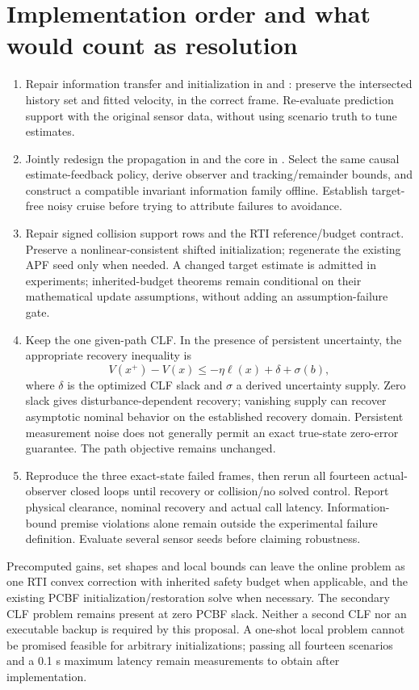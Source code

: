 \documentclass[11pt]{article}
\begin{document}
\section{Implementation order and what would count as resolution}
\begin{enumerate}[leftmargin=*]
\item Repair information transfer and initialization in
 and
: preserve the intersected history
set and fitted velocity, in the correct frame. Re-evaluate prediction support
with the original sensor data, without using scenario truth to tune estimates.
\item Jointly redesign the propagation in 
and the core in . Select the same causal
estimate-feedback policy, derive observer and tracking/remainder bounds, and
construct a compatible invariant information family offline. Establish
target-free noisy cruise before trying to attribute failures to avoidance.
\item Repair signed collision support rows and the RTI reference/budget
contract. Preserve a nonlinear-consistent shifted initialization; regenerate
the existing APF seed only when needed. A changed target estimate is admitted
in experiments; inherited-budget theorems remain conditional on their
mathematical update assumptions, without adding an assumption-failure gate.
\item Keep the one given-path CLF. In the presence of persistent uncertainty,
the appropriate recovery inequality is
\[
 V(x^+)-V(x)\le-\eta\ell(x)+\delta+\sigma(b),
\]
where $\delta$ is the optimized CLF slack and $\sigma$ a derived uncertainty
supply. Zero slack gives disturbance-dependent recovery; vanishing supply
can recover asymptotic nominal behavior on the established recovery domain.
Persistent measurement noise does not generally permit an exact true-state
zero-error guarantee. The path objective remains unchanged.
\item Reproduce the three exact-state failed frames, then rerun all fourteen
actual-observer closed loops until recovery or collision/no solved control.
Report physical clearance, nominal recovery and actual call latency.
Information-bound premise violations alone remain outside the experimental
failure definition. Evaluate several sensor seeds before claiming robustness.
\end{enumerate}

Precomputed gains, set shapes and local bounds can leave the online problem
as one RTI convex correction with inherited safety budget when applicable,
and the existing PCBF initialization/restoration solve when necessary. The
secondary CLF problem remains present at zero PCBF slack. Neither a second
CLF nor an executable backup is required by this proposal. A one-shot local
problem cannot be promised feasible for arbitrary initializations; passing
all fourteen scenarios and a 0.1 s maximum latency remain measurements to
obtain after implementation.
\end{document}
